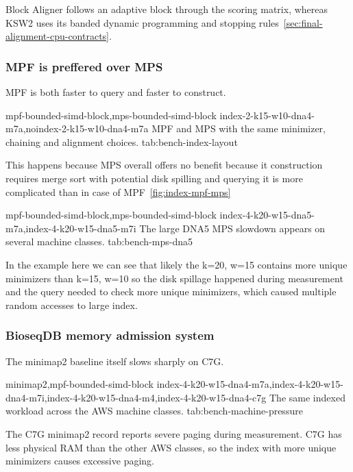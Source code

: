 Block Aligner follows an adaptive block through the scoring matrix, whereas
KSW2 uses its banded dynamic programming and stopping rules~\ref{sec:final-alignment-cpu-contracts}.

\subsubsection{MPF is preffered over MPS}
\label{sec:bench-index-layout}

MPF is both faster to query and faster to construct.

  {mpf-bounded-simd-block,mps-bounded-simd-block}
  {index-2-k15-w10-dna4-m7a,noindex-2-k15-w10-dna4-m7a}
  {MPF and MPS with the same minimizer, chaining and alignment choices.}
  {tab:bench-index-layout}

This happens because MPS overall offers no benefit because it construction requires merge sort with potential disk spilling and querying it is more complicated than in case of MPF~\ref{fig:index-mpf-mps}


  {mpf-bounded-simd-block,mps-bounded-simd-block}
  {index-4-k20-w15-dna5-m7a,index-4-k20-w15-dna5-m7i}
  {The large DNA5 MPS slowdown appears on several machine classes.}
  {tab:bench-mps-dna5}

In the example here we can see that likely the k=20, w=15 contains more unique minimizers than k=15, w=10 so the disk spillage happened 
during measurement and the query needed to check more unique minimizers, which caused multiple random accesses to large index.

\subsubsection{BioseqDB memory admission system}
\label{sec:bench-machine-pressure}

The minimap2 baseline itself slows sharply on C7G.

  {minimap2,mpf-bounded-simd-block}
  {index-4-k20-w15-dna4-m7a,index-4-k20-w15-dna4-m7i,index-4-k20-w15-dna4-m4,index-4-k20-w15-dna4-c7g}
  {The same indexed workload across the AWS machine classes.}
  {tab:bench-machine-pressure}

The C7G minimap2 record reports severe paging during measurement.
C7G has less physical RAM than
the other AWS classes, so the index with more unique minimizers causes excessive paging.

